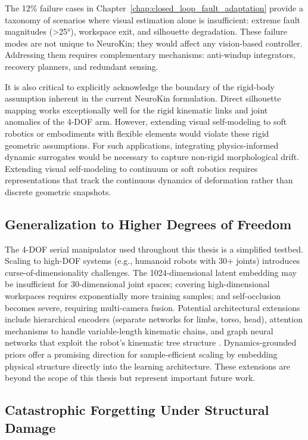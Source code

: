 \documentclass[12pt,a4paper,oneside]{report}
\begin{document}
The 12\% failure cases in Chapter~\ref{chap:closed_loop_fault_adaptation} provide a taxonomy of scenarios where visual estimation alone is insufficient: extreme fault magnitudes (>25°), workspace exit, and silhouette degradation. These failure modes are not unique to NeuroKin; they would affect any vision-based controller. Addressing them requires complementary mechanisms: anti-windup integrators, recovery planners, and redundant sensing.

It is also critical to explicitly acknowledge the boundary of the rigid-body assumption inherent in the current NeuroKin formulation. Direct silhouette mapping works exceptionally well for the rigid kinematic links and joint anomalies of the 4-DOF arm. However, extending visual self-modeling to soft robotics or embodiments with flexible elements would violate these rigid geometric assumptions. For such applications, integrating physics-informed dynamic surrogates would be necessary to capture non-rigid morphological drift. Extending visual self-modeling to continuum or soft robotics requires representations that track the continuous dynamics of deformation rather than discrete geometric snapshots.

\subsection{Generalization to Higher Degrees of Freedom}
\label{subsec:generalization_to_higher_degrees_of_freedom}

The 4-DOF serial manipulator used throughout this thesis is a simplified testbed. Scaling to high-DOF systems (e.g., humanoid robots with 30+ joints) introduces curse-of-dimensionality challenges. The 1024-dimensional latent embedding may be insufficient for 30-dimensional joint spaces; covering high-dimensional workspaces requires exponentially more training samples; and self-occlusion becomes severe, requiring multi-camera fusion. Potential architectural extensions include hierarchical encoders (separate networks for limbs, torso, head), attention mechanisms to handle variable-length kinematic chains, and graph neural networks that exploit the robot's kinematic tree structure \cite{patel2024getzero}. Dynamics-grounded priors offer a promising direction for sample-efficient scaling by embedding physical structure directly into the learning architecture. These extensions are beyond the scope of this thesis but represent important future work.

\subsection{Catastrophic Forgetting Under Structural Damage}
\label{subsec:catastrophic_forgetting_under_structural_damage}
\end{document}
